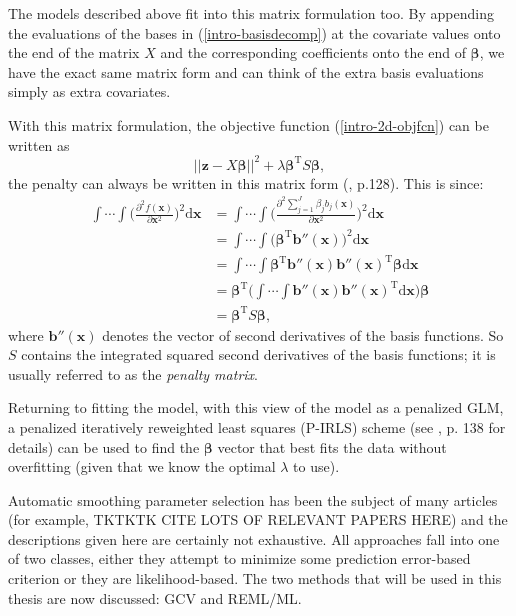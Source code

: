 The models described above fit into this matrix formulation too. By appending the evaluations of the bases in (\ref{intro-basisdecomp}) at the covariate values onto the end of the matrix $X$ and the corresponding coefficients onto the end of $\bm{\beta}$, we have the exact same matrix form and can think of the extra basis evaluations simply as extra covariates. 

With this matrix formulation, the objective function (\ref{intro-2d-objfcn}) can be written as
\begin{equation}
\lvert \lvert \bm{z} - X\bm{\beta} \rvert \rvert^2 + \lambda \bm{\beta}^\text{T} S \bm{\beta},
\end{equation}
the penalty can always be written in this matrix form (\cite{simonbook}, p.128). This is since:
\begin{align*}
\int\cdots\int \Big(\frac{\partial^2 f(\mathbf{x})}{\partial \mathbf{x}^2}\Big)^2 \text{d}\mathbf{x} &= \int\cdots\int \Big(\frac{\partial^2 \sum_{j=1}^J \beta_j b_j(\mathbf{x})}{\partial \mathbf{x}^2}\Big)^2 \text{d}\mathbf{x}\\
&= \int\cdots\int \Big(\bm{\beta}^\text{T}\mathbf{b}''(\mathbf{x})\Big)^2 \text{d}\mathbf{x}\\
&= \int\cdots\int \bm{\beta}^\text{T}\mathbf{b}''(\mathbf{x})\mathbf{b}''(\mathbf{x})^\text{T}\bm{\beta} \text{d}\mathbf{x}\\
&=\bm{\beta}^\text{T} \Big( \int\cdots\int \mathbf{b}''(\mathbf{x})\mathbf{b}''(\mathbf{x})^\text{T} \text{d}\mathbf{x}\Big) \bm{\beta}\\
&=\bm{\beta}^\text{T} S \bm{\beta},
\end{align*}
where $\mathbf{b}''(\mathbf{x})$ denotes the vector of second derivatives of the basis functions. So $S$ contains the integrated squared second derivatives of the basis functions; it is usually referred to as the \textit{penalty matrix}.

Returning to fitting the model, with this view of the model as a penalized GLM, a penalized iteratively reweighted least squares (P-IRLS) scheme (see \cite{simonbook}, p. 138 for details) can be used to find the $\bm{\beta}$ vector that best fits the data without overfitting (given that we know the optimal $\lambda$ to use).

Automatic smoothing parameter selection has been the subject of many articles (for example, TKTKTK CITE LOTS OF RELEVANT PAPERS HERE) and the descriptions given here are certainly not exhaustive. All approaches fall into one of two classes, either they attempt to minimize some prediction error-based criterion or they are likelihood-based. The two methods that will be used in this thesis are now discussed: GCV and REML/ML.



